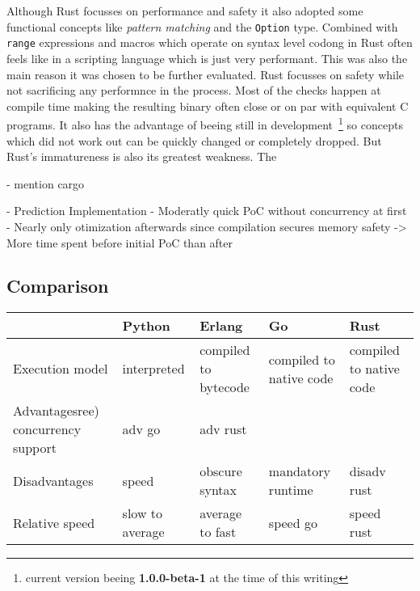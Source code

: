 Although Rust focusses on performance and safety it also adopted some functional concepts like \textit{pattern matching} and the \lstinline$Option$ type. Combined with \lstinline$range$ expressions and macros which operate on syntax level codong in Rust often feels like in a scripting language which is just very performant. This was also the main reason it was chosen to be further evaluated. Rust focusses on safety while not sacrificing any performnce in the process. Most of the checks happen at compile time making the resulting binary often close or on par with equivalent C programs. It also has the advantage of beeing still in development~\footnote{current version beeing \textbf{1.0.0-beta-1} at the time of this writing} so concepts which did not work out can be quickly changed or completely dropped.
But Rust's immatureness is also its greatest weakness. The

- mention cargo

- Prediction Implementation
    - Moderatly quick PoC without concurrency at first
    - Nearly only otimization afterwards since compilation secures memory safety
    -> More time spent before initial PoC than after


\subsection*{Comparison}
\label{subsec:State_of_the_art::Candidates::Comparison}

\begin{tabular}{llll}
    \toprule
        & Python
        & Erlang
        & Go
        & Rust \\
    \midrule

    Execution model
        & interpreted
        & compiled to bytecode
        & compiled to native code
        & compiled to native code \\

    Advantagesree) concurrency support
        & adv go
        & adv rust \\

    Disadvantages
        & speed
        & obscure syntax
        & mandatory runtime
        & disadv rust \\

    Relative speed
        & slow to average
        & average to fast
        & speed go
        & speed rust \\
    \bottomrule
\end{tabular}
